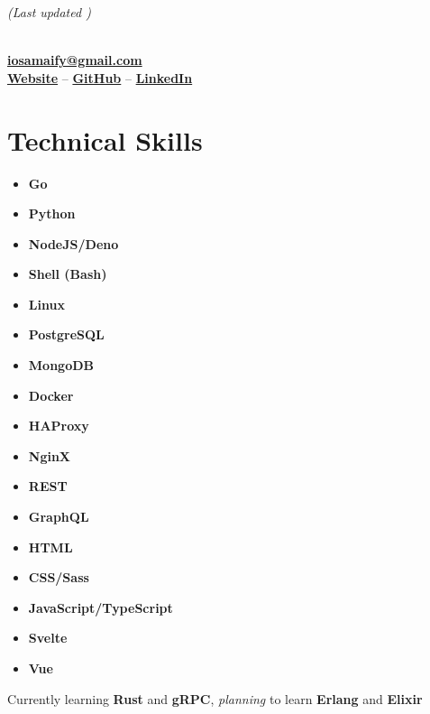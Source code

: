 \documentclass[letterpaper, 10pt]{article}
\author{Osama Muhammad}
\date{\today}
\makeatletter
\renewcommand{\maketitle}{
	\hfill{\small\textit{(Last updated \thedate)}}
	\vspace{1em}
	\begin{center}
		\par{\huge\bfseries{\theauthor}}
		\vspace{0.7em}\\
		\href{mailto:iosamaify@gmail.com}{\textbf{iosamaify@gmail.com}}
		\vspace{0.7em}\\
		\href{https://osamai.github.io}{\textbf{Website}} --
		\href{https://github.com/osamai}{\textbf{GitHub}} --
		\href{https://www.linkedin.com/in/iosama}{\textbf{LinkedIn}}
	\end{center}
}
\newcommand{\hr}{\par{\vspace{-.3\ht\strutbox}\noindent\hrulefill\par}}
\makeatother
\begin{document}
\maketitle

\hr

\section{Technical Skills}

\begin{multicols}{3}
	\begin{itemize}
		\item \textbf{Go}
		\item \textbf{Python}
		\item \textbf{NodeJS/Deno}
		\item \textbf{Shell (Bash)}
		\item \textbf{Linux}
		\item \textbf{PostgreSQL}
		\item \textbf{MongoDB}
		\item \textbf{Docker}
		\item \textbf{HAProxy}
		\item \textbf{NginX}
		\item \textbf{REST}
		\item \textbf{GraphQL}
		\item \textbf{HTML}
		\item \textbf{CSS/Sass}
		\item \textbf{JavaScript/TypeScript}
		\item \textbf{Svelte}
		\item \textbf{Vue}
	\end{itemize}
\end{multicols}

Currently learning \textbf{Rust} and \textbf{gRPC}, \textit{planning} to learn \textbf{Erlang} and \textbf{Elixir}
\end{document}

